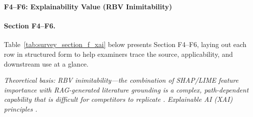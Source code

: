 \noindent\textbf{F4--F6: Explainability Value (RBV Inimitability)}
\paragraph{Section F4--F6.}
\noindent Table~\ref{tab:survey_section_f_xai} below presents Section F4--F6, laying out each row in structured form to help examiners trace the source, applicability, and downstream use at a glance. %


\noindent\textit{Theoretical basis: RBV inimitability---the combination of SHAP/LIME feature importance with RAG-generated literature grounding is a complex, path-dependent capability that is difficult for competitors to replicate \cite{barney1991firm}. Explainable AI (XAI) principles \cite{arrieta2020xai}.}

